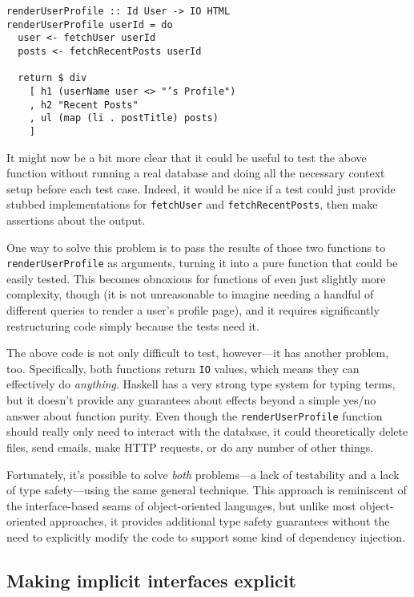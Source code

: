 \begin{verbatim}
renderUserProfile :: Id User -> IO HTML
renderUserProfile userId = do
  user <- fetchUser userId
  posts <- fetchRecentPosts userId

  return $ div
    [ h1 (userName user <> "’s Profile")
    , h2 "Recent Posts"
    , ul (map (li . postTitle) posts)
    ]
\end{verbatim}
It might now be a bit more clear that it could be useful to test the
above function without running a real database and doing all the
necessary context setup before each test case. Indeed, it would be nice
if a test could just provide stubbed implementations for
\texttt{fetchUser} and \texttt{fetchRecentPosts}, then make assertions
about the output.

One way to solve this problem is to pass the results of those two
functions to \texttt{renderUserProfile} as arguments, turning it into a
pure function that could be easily tested. This becomes obnoxious for
functions of even just slightly more complexity, though (it is not
unreasonable to imagine needing a handful of different queries to render
a user's profile page), and it requires significantly restructuring code
simply because the tests need it.

The above code is not only difficult to test, however---it has another
problem, too. Specifically, both functions return \texttt{IO} values,
which means they can effectively do \emph{anything}. Haskell has a very
strong type system for typing terms, but it doesn't provide any
guarantees about effects beyond a simple yes/no answer about function
purity. Even though the \texttt{renderUserProfile} function should
really only need to interact with the database, it could theoretically
delete files, send emails, make HTTP requests, or do any number of other
things.

Fortunately, it's possible to solve \emph{both} problems---a lack of
testability and a lack of type safety---using the same general
technique. This approach is reminiscent of the interface-based seams of
object-oriented languages, but unlike most object-oriented approaches,
it provides additional type safety guarantees without the need to
explicitly modify the code to support some kind of dependency injection.

\subsection{Making implicit interfaces
explicit}
\label{making-implicit-interfaces-explicit}

